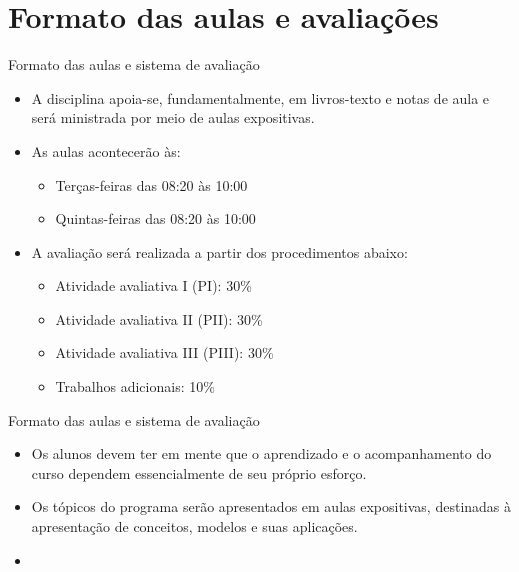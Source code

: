\documentclass[10pt]{beamer}
\begin{document}
\section{Formato das aulas e avaliações}
\begin{frame}{Formato das aulas e sistema de avaliação}
    \begin{itemize}
        \item A disciplina apoia-se, fundamentalmente, em livros-texto e notas de aula e será ministrada por meio de aulas expositivas.\bigskip

        \item As aulas acontecerão às:\medskip
              \begin{itemize}
                  \item Terças-feiras das 08:20 às 10:00
                  \item Quintas-feiras das 08:20 às 10:00\bigskip
              \end{itemize}

        \item A avaliação será realizada a partir dos procedimentos abaixo:\medskip
              \begin{itemize}
                  \item Atividade avaliativa I (PI): 30\%
                  \item Atividade avaliativa II (PII): 30\%
                  \item Atividade avaliativa III (PIII): 30\%
                  \item Trabalhos adicionais: 10\%
              \end{itemize}
    \end{itemize}
\end{frame}

\begin{frame}{Formato das aulas e sistema de avaliação}
    \begin{itemize}
        \item Os alunos devem ter em mente que o aprendizado e o acompanhamento do curso dependem essencialmente de seu próprio esforço.\bigskip

        \item Os tópicos do programa serão apresentados em aulas expositivas, destinadas à apresentação de conceitos, modelos e suas aplicações.\bigskip

        \item[\emoji{warning}] 
    \end{itemize}
\end{frame}
\end{document}
